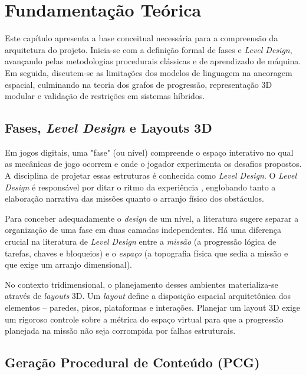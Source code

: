 \section{Fundamentação Teórica}
\label{sec:fundamentacao}

Este capítulo apresenta a base conceitual necessária para a compreensão da arquitetura do projeto. Inicia-se com a definição formal de fases e \textit{Level Design}, avançando pelas metodologias procedurais clássicas e de aprendizado de máquina. Em seguida, discutem-se as limitações dos modelos de linguagem na ancoragem espacial, culminando na teoria dos grafos de progressão, representação 3D modular e validação de restrições em sistemas híbridos.

\subsection{Fases, \textit{Level Design} e Layouts 3D}
\label{sec:level_design}

Em jogos digitais, uma "fase" (ou nível) compreende o espaço interativo no qual as mecânicas de jogo ocorrem e onde o jogador experimenta os desafios propostos. A disciplina de projetar essas estruturas é conhecida como \textit{Level Design}. O \textit{Level Design} é responsável por ditar o ritmo da experiência \cite{dormans2010}, englobando tanto a elaboração narrativa das missões quanto o arranjo físico dos obstáculos.

Para conceber adequadamente o \textit{design} de um nível, a literatura sugere separar a organização de uma fase em duas camadas independentes. Há uma diferença crucial na literatura de \textit{Level Design} \cite{dormans2010} entre a \textit{missão} (a progressão lógica de tarefas, chaves e bloqueios) e o \textit{espaço} (a topografia física que sedia a missão e que exige um arranjo dimensional). 

No contexto tridimensional, o planejamento desses ambientes materializa-se através de \textit{layouts} 3D. Um \textit{layout} define a disposição espacial arquitetônica dos elementos -- paredes, pisos, plataformas e interações. Planejar um layout 3D exige um rigoroso controle sobre a métrica do espaço virtual para que a progressão planejada na missão não seja corrompida por falhas estruturais.

\subsection{Geração Procedural de Conteúdo (PCG)}
\label{sec:pcg}

